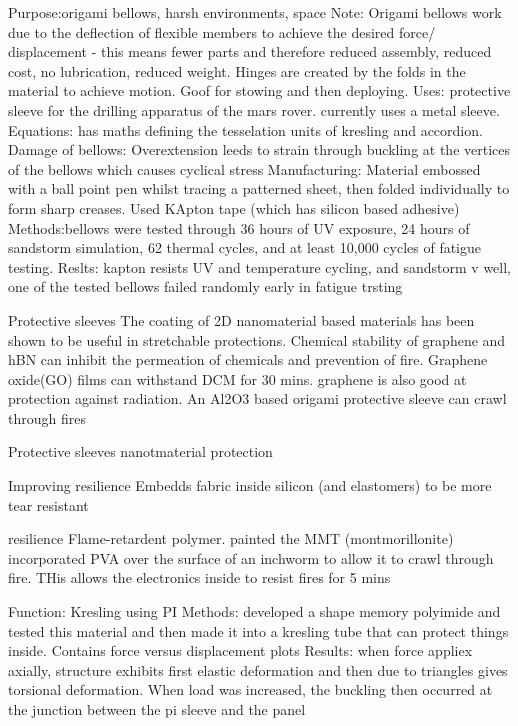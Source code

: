 \cite{butler2016highly}
Purpose:origami bellows, harsh environments, space
Note: Origami bellows work due to the deflection of flexible members to achieve the desired force/ displacement - this means fewer parts and therefore reduced assembly, reduced cost, no lubrication, reduced weight. Hinges are created by the folds in the material to achieve motion. Goof for stowing and then deploying.
Uses: protective sleeve for the drilling apparatus of the mars rover. currently uses a metal sleeve.
Equations: has maths defining the tesselation units of kresling and accordion. 
Damage of bellows: Overextension leeds to strain through buckling at the vertices of the bellows which causes cyclical stress
Manufacturing: Material embossed with a ball point pen whilst tracing a patterned sheet, then folded individually to form sharp creases. Used KApton tape (which has silicon based adhesive)
Methods:bellows were tested through 36 hours of UV exposure, 24 hours of sandstorm simulation, 62 thermal cycles, and at least 10,000 cycles of fatigue testing.
Reslts: kapton resists UV and temperature cycling, and sandstorm v well, one of the tested bellows failed randomly early in fatigue trsting




\cite{jing2020recent}
Protective sleeves
The coating of 2D nanomaterial based materials has been shown to be useful in stretchable protections. Chemical stability of graphene and hBN can inhibit the permeation of chemicals and prevention of fire. Graphene oxide(GO) films can withstand DCM for 30 mins. graphene is also good at protection against radiation. An Al2O3 based origami protective sleeve can crawl through fires

\cite{chang2018crumpling}
Protective sleeves
nanotmaterial protection

\cite{wang2018improving}
Improving resilience
Embedds fabric inside silicon (and elastomers) to be more tear resistant

\cite{banerjee2022highly}
resilience
Flame-retardent polymer. painted the MMT (montmorillonite) incorporated PVA over the surface of an inchworm to allow it to crawl through fire. THis allows the electronics inside to resist fires for 5 mins

\cite{wang2025multimonomer}
Function: Kresling using PI
Methods: developed a shape memory polyimide and tested this material and then made it into a kresling tube that can protect things inside. Contains force versus displacement plots
Results: when force appliex axially, structure exhibits first elastic deformation and then due to triangles gives torsional deformation. When load was increased, the buckling then occurred at the junction between the pi sleeve and the panel

